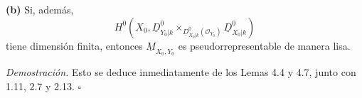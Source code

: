 \smallskip
\noindent\textbf{(b)}
Si, además,
\[
H^0\!\left(
X_0,
\underline D^0_{Y_0|k}
\times_{\underline D^0_{X_0|k}(\mathcal O_{Y_0})}
\underline D^0_{X_0|k}
\right)
\]
tiene dimensión finita, entonces $\underline M_{X_0,Y_0}$ es
pseudorrepresentable de manera lisa.

\medskip
\noindent\textit{Demostración.}
Esto se deduce inmediatamente de los Lemas 4.4 y 4.7, junto con 1.11,
2.7 y 2.13. \hfill$\square$
